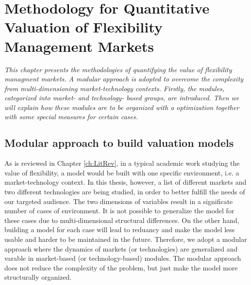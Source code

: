 \chapter{Methodology for Quantitative Valuation of Flexibility Management Markets}
\textit{This chapter presents the methodologies of quantifying the value of flexibility managment markets. A modular approach is adopted to overcome the complexity from multi-dimensioning market-technology contexts. Firstly, the modules, categorized into market- and technology- based groups, are introduced. Then we will explain how these modules are to be organized with a optimization together with some special measures for certain cases.}

\section{Modular approach to build valuation models}
As is reviewed in Chapter \ref{ch:LitRev}, in a typical academic work studying the value of flexibility, a model would be built with one specific environment, i.e. a market-technology context. In this thesis, however, a list of different markets and two different technologies are being studied, in order to better fulfill the needs of our targeted audience. The two dimensions of variables result in a significate number of cases of environment. It is not possible to generalize the model for these cases due to multi-dimensional structural differences. On the other hand, building a model for each case will lead to reduancy and make the model less usable and harder to be maintained in the future. Therefore, we adopt a modular approach where the dynamics of markets (or technologies) are generalized and varable in market-based (or technology-based) modules. The modular approach does not reduce the complexity of the problem, but just make the model more structurally organized.

